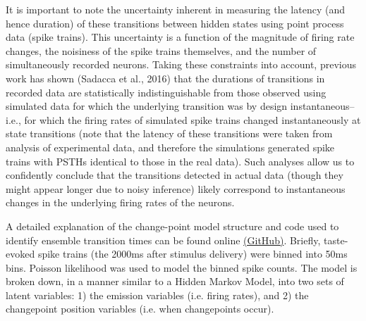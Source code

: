 \begin{refsection}
\noindent It is important to note the uncertainty inherent in measuring the latency (and hence duration) of these transitions between hidden states using point process data (spike trains). This uncertainty is a function of the magnitude of firing rate changes, the noisiness of the spike trains themselves, and the number of simultaneously recorded neurons. Taking these constraints into account, previous work has shown (Sadacca et al., 2016) that the durations of transitions in recorded data are statistically indistinguishable from those observed using simulated data for which the underlying transition was by design instantaneous–i.e., for which the firing rates of simulated spike trains changed instantaneously at state transitions (note that the latency of these transitions were taken from analysis of experimental data, and therefore the simulations generated spike trains with PSTHs identical to those in the real data). Such analyses allow us to confidently conclude that the transitions detected in actual data (though they might appear longer due to noisy inference) likely correspond to instantaneous changes in the underlying firing rates of the neurons.

\noindent A detailed explanation of the change-point model structure and code used to identify ensemble transition times can be found online \href{https://github.com/abuzarmahmood/ pytau/blob/development/pytau/examples/Bayesian_Changepoint_Model.ipynb}{(GitHub)}. Briefly, taste-evoked spike trains (the 2000ms after stimulus delivery) were binned into 50ms bins. Poisson likelihood was used to model the binned spike counts. The model is broken down, in a manner similar to a Hidden Markov Model, into two sets of latent variables: 1) the emission variables (i.e. firing rates), and 2) the changepoint position variables (i.e. when changepoints occur). 


\end{refsection}
